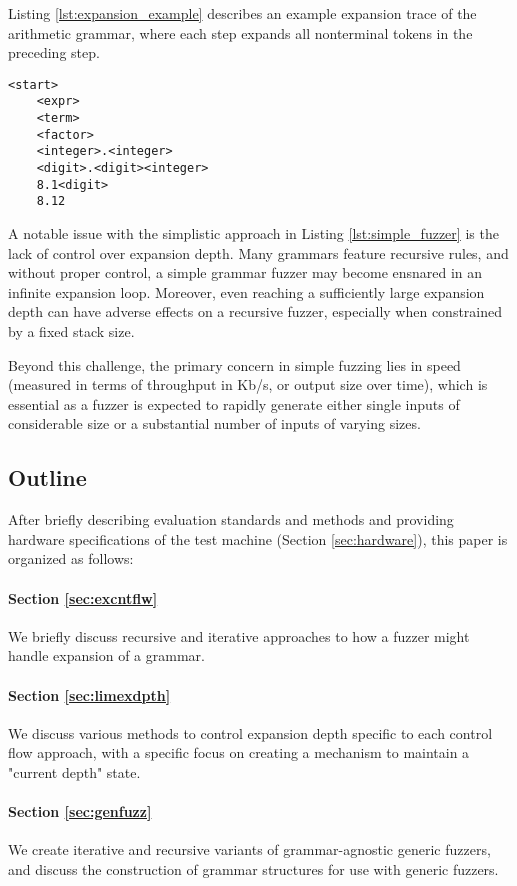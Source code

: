 \documentclass[8pt, twoside]{extarticle}
\begin{document}
Listing \ref{lst:expansion_example} describes an example expansion trace of the arithmetic grammar, where each step expands all nonterminal tokens in the preceding step.

\begin{lstlisting}[gobble=2, caption={Arithmetic grammar expansion}, label=lst:expansion_example]
	<start>
	<expr>
	<term>
	<factor>
	<integer>.<integer>
	<digit>.<digit><integer>
	8.1<digit>
	8.12
\end{lstlisting}

A notable issue with the simplistic approach in Listing \ref{lst:simple_fuzzer} is the lack of control over expansion depth. Many grammars feature recursive rules, and without proper control, a simple grammar fuzzer may become ensnared in an infinite expansion loop. Moreover, even reaching a sufficiently large expansion depth can have adverse effects on a recursive fuzzer, especially when constrained by a fixed stack size.

Beyond this challenge, the primary concern in simple fuzzing lies in speed (measured in terms of throughput in Kb/s, or output size over time), which is essential as a fuzzer is expected to rapidly generate either single inputs of considerable size or a substantial number of inputs of varying sizes.

\subsection{Outline}

After briefly describing evaluation standards and methods and providing hardware specifications of the test machine (Section \ref{sec:hardware}), this paper is organized as follows:

\paragraph{Section \ref{sec:excntflw}} We briefly discuss recursive and iterative approaches to how a fuzzer might handle expansion of a grammar.

\paragraph{Section \ref{sec:limexdpth}} We discuss various methods to control expansion depth specific to each control flow approach, with a specific focus on creating a mechanism to maintain a "current depth" state.

\paragraph{Section \ref{sec:genfuzz}} We create iterative and recursive variants of grammar-agnostic generic fuzzers, and discuss the construction of grammar structures for use with generic fuzzers.
\end{document}
